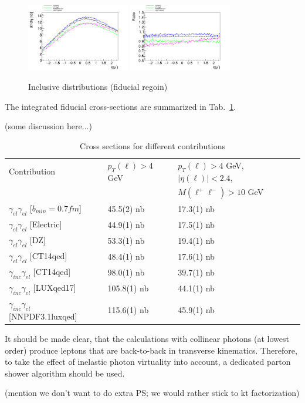 \begin{figure}[h!]
\includegraphics[width=0.4\textwidth]{figures/etal_inc_cut.pdf}
\includegraphics[width=0.4\textwidth]{figures/Ratioetal_inc_cut.pdf}
\caption{Inclusive distributions (fiducial regoin)}
\label{fig:inc_cut}
\end{figure}

The integrated fiducial cross-sections are summarized in Tab.~\ref{fig:xs}.

(some discussion here...)

\begin{table}[!ht]
\begin{center}
\begin{tabular}{|l|l|l|}
\hline
Contribution & $p_T(\ell) > 4$ GeV & $p_T(\ell) > 4$ GeV, $|\eta(\ell)| < 2.4$,\\
& & $M(\ell^+\ell^-) > 10$ GeV\\
\hline
$\gamma_{el}\gamma_{el}$ [$b_{min}=0.7fm$] & 45.5(2) nb & 17.3(1) nb\\
\hline
$\gamma_{el}\gamma_{el}$ [Electric] & 44.9(1) nb & 17.5(1) nb\\
\hline
$\gamma_{el}\gamma_{el}$ [DZ] & 53.3(1) nb & 19.4(1) nb\\
\hline
$\gamma_{el}\gamma_{el}$ [CT14qed] & 48.4(1) nb & 17.6(1) nb\\
\hline
$\gamma_{inc}\gamma_{el}$ [CT14qed] & 98.0(1) nb & 39.7(1) nb\\
\hline
$\gamma_{inc}\gamma_{el}$ [LUXqed17] & 105.8(1) nb & 44.1(1) nb\\
\hline
$\gamma_{inc}\gamma_{el}$ [NNPDF3.1luxqed] & 115.6(1) nb & 45.9(1) nb\\
\hline
\end{tabular}
\end{center}
\caption{Cross sections for different contributions}
\label{fig:xs}
\end{table}

It should be made clear, that the calculations with collinear photons (at lowest order) produce leptons that are back-to-back in transverse kinematics. Therefore, to take the effect of inelastic photon virtuality into account, a dedicated parton shower algorithm should be used.

(mention we don't want to do extra PS; we would rather stick to kt factorization)
